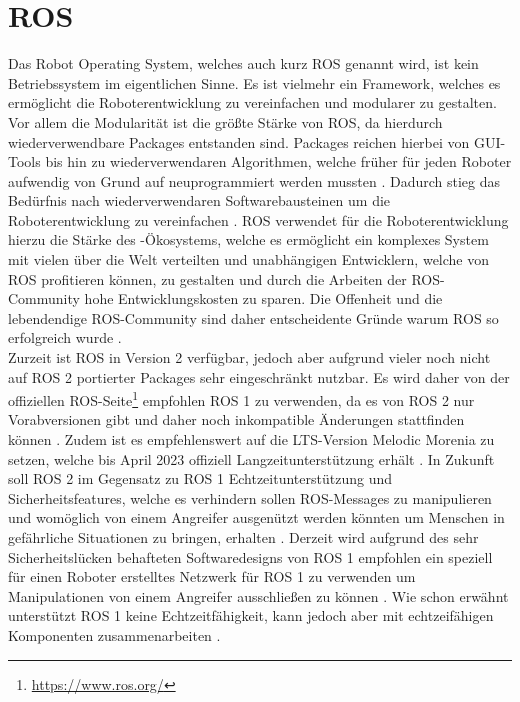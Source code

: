 \section{ROS}
Das Robot Operating System, welches auch kurz ROS genannt wird, ist kein Betriebssystem im eigentlichen Sinne. Es ist vielmehr ein Framework, welches es ermöglicht die Roboterentwicklung zu vereinfachen und modularer zu gestalten. Vor allem die Modularität ist die größte Stärke von ROS, da hierdurch wiederverwendbare Packages entstanden sind. Packages reichen hierbei von GUI-Tools bis hin zu wiederverwendaren Algorithmen, welche früher für jeden Roboter aufwendig von Grund auf neuprogrammiert werden mussten \cite{pohl_robot_operating_system_2014}. Dadurch stieg das Bedürfnis nach wiederverwendaren Softwarebausteinen um die Roboterentwicklung zu vereinfachen \cite[517]{worn_echtzeitsysteme_2006}. ROS verwendet für die Roboterentwicklung hierzu die Stärke des -Ökosystems, welche es ermöglicht ein komplexes System mit vielen über die Welt verteilten und unabhängigen Entwicklern, welche von ROS profitieren können, zu gestalten und durch die Arbeiten der ROS-Community hohe Entwicklungskosten zu sparen. Die Offenheit und die lebendendige ROS-Community sind daher entscheidente Gründe warum ROS so erfolgreich wurde \cite[411\psq]{koubaa_robot_operating_system_2019}.\\

Zurzeit ist ROS in Version 2 verfügbar, jedoch aber aufgrund vieler noch nicht auf ROS 2 portierter Packages sehr eingeschränkt nutzbar. Es wird daher von der offiziellen ROS-Seite\footnote{\href{https://www.ros.org/}{https://www.ros.org/}} empfohlen ROS 1 zu verwenden, da es von ROS 2 nur Vorabversionen gibt und daher noch inkompatible Änderungen stattfinden können \cite{noauthor_ros_distributions_nodate}. Zudem ist es empfehlenswert auf die LTS-Version Melodic Morenia zu setzen, welche bis April 2023 offiziell Langzeitunterstützung erhält \cite{noauthor_robot_operating_system_2020}. In Zukunft soll ROS 2 im Gegensatz zu ROS 1 Echtzeitunterstützung und Sicherheitsfeatures, welche es verhindern sollen ROS-Messages zu manipulieren und womöglich von einem Angreifer ausgenützt werden könnten um Menschen in gefährliche Situationen zu bringen, erhalten \cite[613\psqq]{koubaa_robot_operating_system_2019}. Derzeit wird  aufgrund des sehr Sicherheitslücken behafteten Softwaredesigns von ROS 1 empfohlen ein speziell für einen Roboter erstelltes Netzwerk für ROS 1 zu verwenden um Manipulationen von einem Angreifer ausschließen zu können \cite{pohl_robot_2014}. Wie schon erwähnt unterstützt ROS 1 keine Echtzeitfähigkeit, kann jedoch aber mit echtzeifähigen Komponenten zusammenarbeiten \cite{noauthor_robot_operating_system_2020}.\clearpage

